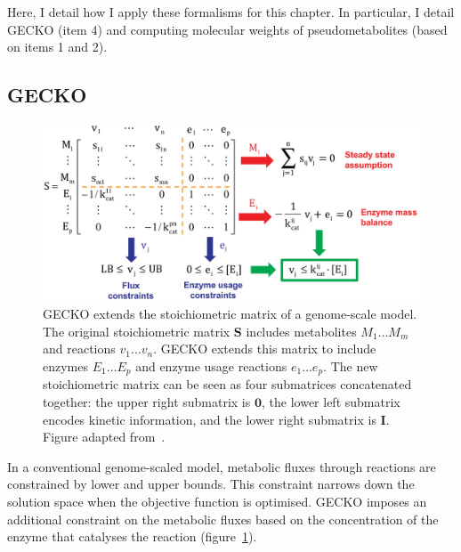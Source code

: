 Here, I detail how I apply these formalisms for this chapter.
In particular, I detail GECKO (item 4) and computing molecular weights of pseudometabolites (based on items 1 and 2).

\subsection{GECKO}
\label{subsec:model-yeast8-gecko}

\begin{figure}
  \centering
  \includegraphics[width=0.9\linewidth]{sanchezImprovingPhenotypePredictions2017_1b_adapted}
  \caption{
    GECKO extends the stoichiometric matrix of a genome-scale model.
    The original stoichiometric matrix $\mathbf{S}$ includes metabolites $M_{1} \ldots M_{m}$ and reactions $v_{1} \ldots v_{n}$.
    GECKO extends this matrix to include enzymes $E_{1} \ldots E_{p}$ and enzyme usage reactions $e_{1} \ldots e_{p}$.
    The new stoichiometric matrix can be seen as four submatrices concatenated together: the upper right submatrix is $\mathbf{0}$, the lower left submatrix encodes kinetic information, and the lower right submatrix is $\mathbf{I}$.
    Figure adapted from~\textcite{sanchezImprovingPhenotypePredictions2017}.
  }
  \label{fig:model-gecko}
\end{figure}

In a conventional genome-scaled model, metabolic fluxes through reactions are constrained by lower and upper bounds.
This constraint narrows down the solution space when the objective function is optimised.
GECKO imposes an additional constraint on the metabolic fluxes based on the concentration of the enzyme that catalyses the reaction (figure~\ref{fig:model-gecko}).

